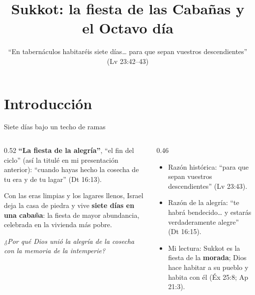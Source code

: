 \documentclass[hyperref={bookmarks=false},aspectratio=169]{beamer}
\title[Sukkot]{\bfseries{Sukkot: la fiesta de las Cabañas y el Octavo día}}
\subtitle{``En tabernáculos habitaréis siete días\ldots{} para que sepan vuestros descendientes'' (Lv 23:42--43)}
\author{}\institute{}\date{}
\newcommand{\destacar}[1]{\textbf{\textcolor{tierraroja}{#1}}}
\begin{document}
\frame{\titlepage}


\section{Introducción}

\begin{frame}{Siete días bajo un techo de ramas}
\begin{columns}[c,onlytextwidth]
\begin{column}{0.52\textwidth}
\small\destacar{``La fiesta de la alegría''}, ``el fin del ciclo'' (así la titulé en mi presentación anterior): ``cuando hayas hecho la cosecha de tu era y de tu lagar'' (Dt 16:13).\par\smallskip Con las eras limpias y los lagares llenos, Israel deja la casa de piedra y vive \destacar{siete días en una cabaña}: la fiesta de mayor abundancia, celebrada en la vivienda más pobre.\par\medskip
\begin{tcolorbox}[colback=papiro,colframe=tierraroja,boxrule=1pt,arc=3pt,left=4pt,right=4pt]
\small\itshape ¿Por qué Dios unió la alegría de la cosecha con la memoria de la intemperie?
\end{tcolorbox}
\end{column}
\begin{column}{0.46\textwidth}\small
\begin{itemize}
\item Razón histórica: ``para que sepan vuestros descendientes'' (Lv 23:43).
\item Razón de la alegría: ``te habrá bendecido\ldots{} y estarás verdaderamente alegre'' (Dt 16:15).
\item Mi lectura: Sukkot es la fiesta de la \destacar{morada}; Dios hace habitar a su pueblo y habita con él (Éx 25:8; Ap 21:3).
\end{itemize}
\end{column}
\end{columns}
\end{frame}
\end{document}
